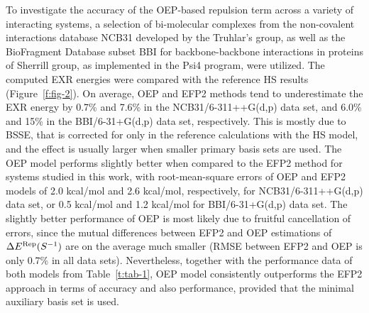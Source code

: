 To investigate the accuracy of the OEP\hyp{}based repulsion
term across
a variety of
interacting systems, a selection of
bi\hyp{}molecular complexes from the non\hyp{}covalent
interactions database NCB31 developed by the Truhlar's 
group,\cite{Zhao.Schultz.Truhlar.JCTC.2006,
Zhao.Truhlar.JCTC.2005,Zhao.Schultz.Truhlar.JCTC.2006,Zhao.Schultz.Truhlar.JCP.2005}
as well as the BioFragment Database subset BBI for backbone\hyp{}backbone
interactions in proteins of Sherrill group,\cite{Burns.Faver.Zheng.Marshall.Smith.Vanommeslaeghe.MacKerell.Merz.Sherrill.JCP.2017} 
as implemented in the {\sc Psi4}
program,\cite{Psi4.JCTC.2017}
were utilized. The computed
EXR energies were compared with the reference HS results (Figure~\ref{f:fig-2}).
On average, OEP and EFP2 methods tend to underestimate the EXR energy by 0.7\% and 7.6\%
in the NCB31/6-311++G(d,p) data set, and 6.0\% and 15\% in the BBI/6-31+G(d,p) data set,
respectively.
This is mostly due to BSSE, that is corrected for
only in the reference calculations with the HS model, and the effect is usually larger
when smaller primary basis sets are used.
The OEP model performs slightly better when compared to the EFP2
method for systems studied in this work, with 
root-mean-square errors of OEP and EFP2 models of
2.0 kcal/mol and 2.6 kcal/mol, respectively, for NCB31/6-311++G(d,p) data set, 
or
0.5 kcal/mol and 1.2 kcal/mol for BBI/6-31+G(d,p) data set.
The slightly better performance of OEP is most likely due to
fruitful cancellation of errors, since
the mutual differences between EFP2 and OEP estimations of 
$\Delta E^{\rm Rep}(S^{-1})$ are on the average much smaller
(RMSE between EFP2 and OEP is only 0.7\% in all data sets).
%
% 
%
Nevertheless, together with the performance data of both models
from Table~\ref{t:tab-1}, OEP model consistently outperforms the
EFP2 approach in terms of accuracy and also performance, provided
that the minimal auxiliary basis set is used.

